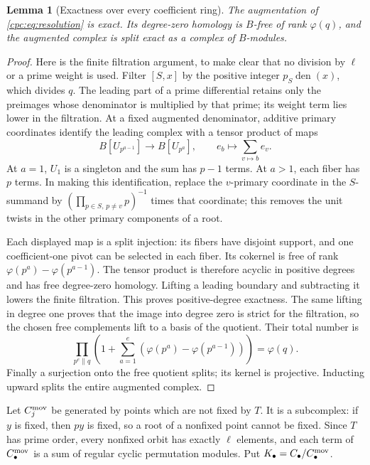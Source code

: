 \documentclass[11pt,a4paper]{article}
\numberwithin{equation}{section}
\newtheorem{lemma}[theorem]{Lemma}
\theoremstyle{definition}
\theoremstyle{remark}
\begin{document}
\begin{lemma}[Exactness over every coefficient ring]
\label{cpc:lem:resolution}
The augmentation of \eqref{cpc:eq:resolution} is exact. Its degree-zero
homology is $B$-free of rank $\varphi(q)$, and the augmented complex
is split exact as a complex of $B$-modules.
\end{lemma}
\begin{proof}
Here is the finite filtration argument, to make clear that no division
by $\ell$ or a prime weight is used. Filter $[S,x]$ by the positive
integer $p_S\operatorname{den}(x)$, which divides $q$. The leading
part of a prime differential retains only the preimages whose
denominator is multiplied by that prime; its weight term lies lower
in the filtration. At a fixed augmented denominator, additive primary
coordinates identify the leading complex with a tensor product of
maps
\[
 B[U_{p^{a-1}}]\longrightarrow B[U_{p^a}],
 \qquad e_b\longmapsto\sum_{v\mapsto b}e_v.
\]
At $a=1$, $U_1$ is a singleton and the sum has $p-1$ terms.
At $a>1$, each fiber has $p$ terms. In making this identification,
replace the $v$-primary coordinate in the $S$-summand by
$(\prod_{p\in S,\,p\ne v}p)^{-1}$ times that coordinate; this
removes the unit twists in the other primary components of a root.

Each displayed map is a split injection: its fibers have disjoint
support, and one coefficient-one pivot can be selected in each fiber.
Its cokernel is free of rank
$\varphi(p^a)-\varphi(p^{a-1})$. The tensor product is therefore
acyclic in positive degrees and has free degree-zero homology.
Lifting a leading boundary and subtracting it lowers the finite
filtration. This proves positive-degree exactness. The same lifting
in degree one proves that the image into degree zero is strict for
the filtration, so the chosen free complements lift to a basis of
the quotient. Their total number is
\[
 \prod_{p^e\parallel q}
 \left(1+\sum_{a=1}^{e}
      (\varphi(p^a)-\varphi(p^{a-1}))\right)=\varphi(q).
\]
Finally a surjection onto the free quotient splits; its kernel is
projective. Inducting upward splits the entire augmented complex.
\end{proof}

Let $C_j^{\rm mov}$ be generated by points which are not fixed by
$T$. It is a subcomplex: if $y$ is fixed, then $py$ is fixed, so a
root of a nonfixed point cannot be fixed. Since $T$ has prime order,
every nonfixed orbit has exactly $\ell$ elements, and each term of
$C_\bullet^{\rm mov}$ is a sum of regular cyclic permutation modules.
Put $K_\bullet=C_\bullet/C_\bullet^{\rm mov}$.
\end{document}
